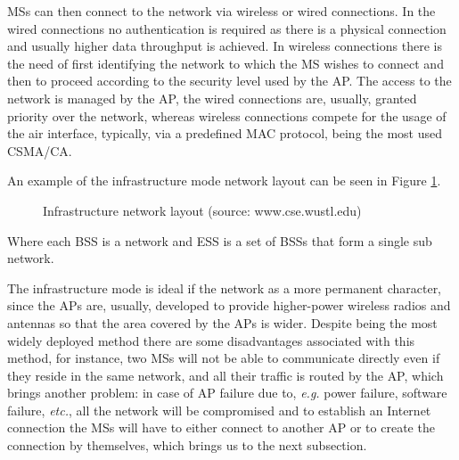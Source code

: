 \gls{MS}s can then connect to the network via wireless or wired connections. In the wired connections no authentication is required as there is a physical connection and usually higher data throughput is achieved. In wireless connections there is the need of first identifying the network to which the \gls{MS} wishes to connect and then to proceed according to the security level used by the \gls{AP}. The access to the network is managed by the \gls{AP}, the wired connections are, usually, granted priority over the network, whereas wireless connections compete for the usage of the air interface, typically, via a predefined \gls{MAC} protocol, being the most used \gls{CSMA/CA}.

An example of the infrastructure mode network layout can be seen in Figure \ref{fig:infranet}.

\begin{figure}[ht]
	\noindent{}
	\caption{\label{fig:infranet} Infrastructure network layout (source: www.cse.wustl.edu)}
\end{figure}

Where each \gls{BSS} is a network and \gls{ESS} is a set of \glspl{BSS} that form a single sub network.

The infrastructure mode is ideal if the network as a more permanent character, since the \glspl{AP} are, usually, developed to provide higher-power wireless radios and antennas so that the area covered by the \glspl{AP} is wider. Despite being the most widely deployed method there are some disadvantages associated with this method, for instance, two \glspl{MS} will not be able to communicate directly even if they reside in the same network, and all their traffic is routed by the \gls{AP}, which brings another problem: in case of \gls{AP} failure due to, \textit{e.g.} power failure, software failure, \textit{etc.}, all the network will be compromised and to establish an Internet connection the \glspl{MS} will have to either connect to another \gls{AP} or to create the connection by themselves, which brings us to the next subsection.


